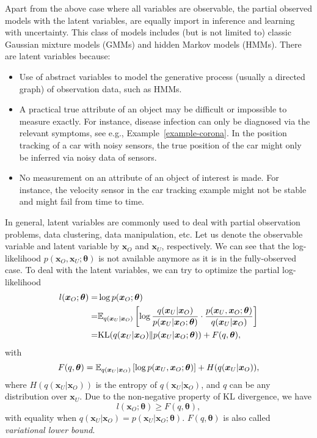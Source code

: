 Apart from the above case where all variables are observable, the partial observed models with the latent variables, are equally import in inference and learning with uncertainty. This class of models includes (but is not limited to) classic Gaussian mixture models (GMMs) and hidden Markov models (HMMs). There are latent variables because:
\begin{itemize}
\item Use of abstract variables to model the generative process (usually a directed graph) of observation data, such as HMMs.
\item A practical true attribute of an object may be difficult or impossible to measure exactly. For instance, disease infection can only be diagnosed via the relevant symptoms, see e.g., Example~\ref{example-corona}. In the position tracking of a car with noisy sensors, the true position of the car might only be inferred via noisy data of sensors.
\item No measurement on an attribute of an object of interest is made. For instance, the velocity sensor in the car tracking example might not be stable and might fail from time to time.
\end{itemize}
In general, latent variables are commonly used to deal with partial observation problems, data clustering, data manipulation, etc. Let us denote the observable variable and latent variable by $\bm{x}_O$ and $\bm{x}_U$, respectively. We can see that the log-likelihood $p(\bm{x}_O, \bm{x}_U; \bm{\theta})$ is not available anymore as it is in the fully-observed case. To deal with the latent variables, we can try to optimize the partial log-likelihood
\begin{align}
  l(\bm{x}_O; \bm{\theta}) =& \log{p(\bm{x}_O; \bm{\theta})} \nonumber \\  
  = & \mathbb{E}_{q(\bm{x}_U|\bm{x}_O)}\left[ \log{\frac{q(\bm{x}_U|\bm{x}_O)}{p(\bm{x}_U|\bm{x}_O;\bm{\theta})} \cdot \frac{p(\bm{x}_U,\bm{x}_O;\bm{\theta})}{q(\bm{x}_U|\bm{x}_O)}} \right] \nonumber \\
  = & \mathrm{KL}(q(\bm{x}_U|\bm{x}_O)\|p(\bm{x}_U|\bm{x}_O;\bm{\theta})) + F(q, \bm{\theta}),
\end{align}
with
\begin{equation}\label{chpt2:eq:llk-lower-bound}
  F(q, \bm{\theta}) = \mathbb{E}_{q(\bm{x}_U|\bm{x}_O)}\left[ \log{p(\bm{x}_U,\bm{x}_O;\bm{\theta})} \right] + H(q(\bm{x}_U|\bm{x}_O)),
\end{equation}
where $H(q(\bm{x}_U|\bm{x}_O))$ is the entropy of $q(\bm{x}_U|\bm{x}_O)$, and $q$ can be any distribution over $\bm{x}_U$. Due to the non-negative property of KL divergence, we have
\begin{equation}
  l(\bm{x}_O; \bm{\theta}) \geq F(q, \bm{\theta}),
\end{equation}
with equality when $q(\bm{x}_U|\bm{x}_O) = p(\bm{x}_U|\bm{x}_O; \bm{\theta})$. $F(q, \bm{\theta})$ is also called \textit{variational lower bound}.

